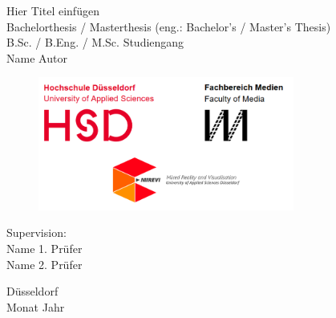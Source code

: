 
\begin{titlepage}
\begin{center}
	\vspace*{1.7cm}	
	\huge Hier Titel einfügen \\
	\vspace*{1.0cm}
	\Large Bachelorthesis / Masterthesis (eng.: Bachelor's / Master's Thesis)\\B.Sc. / B.Eng. / M.Sc. Studiengang\\Name Autor\\
	
	\vspace{4.0cm}
	
	\begin{figure}[htb]
		\begin{center}
			\includegraphics[width=0.75\textwidth]{03_GraphicFiles/title_Logos.png}
		\end{center}
	\end{figure}
	\vspace{0.9cm}
	\Large Supervision: \\ 
	\Large Name 1. Prüfer \\
	\Large Name 2. Prüfer
	
	\vspace{1.5cm}
	\Large D\"usseldorf\\
	\Large Monat Jahr\\
\end{center}
\end{titlepage}